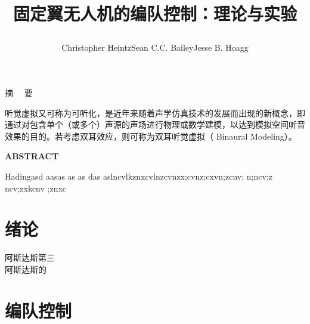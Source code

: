 \documentclass[UTF-8, linspread=1.25, zihao = -4]{ctexart}
\title
{
	\begin{spacing}{1}
		\fontsize{22pt}{22pt}
		\heiti	%
		固定翼无人机的编队控制：理论与实验
	\end{spacing}
}
\author{Christopher Heintz\qquad Sean C.C. Bailey\qquad Jesse B. Hoagg}
\renewenvironment{abstract}
{
	\par
	\vskip 24pt
	\fontsize{16pt}{16pt}
	\noindent\mbox{}\hfill{\heiti 摘 \ \ 要}\hfill\mbox{}
	\vskip 12pt
	\fontsize{12pt}{15pt}
}{\par}
\newenvironment{enabstract}
{
	\par
	\vskip 24pt
	\fontsize{16pt}{16pt}
	\noindent\mbox{}\hfill{\Roman \bf ABSTRACT}\hfill\mbox{}
	\vskip 12pt
	\fontsize{12pt}{15pt}
}{\par}
\begin{document}
	\maketitle
	\tableofcontents
	\begin{abstract}
	{
		听觉虚拟又可称为可听化，是近年来随着声学仿真技术的发展而出现的新概念，即通过对包含单个（或多个）声源的声场进行物理或数学建模，以达到模拟空间听音效果的目的。若考虑双耳效应，则可称为双耳听觉虚拟（ Binaural Modeling）。
	}
	\end{abstract}
	\begin{enabstract}
	{
		Hadingasd aasas as as das aslncvlkznxcvlnzcvnzx;cvnz;cxvn;zcnv; n;ncv;z ncv;zxkcnv ;znxc
	}
	\end{enabstract}
	\section{绪论}
	阿斯达斯第三
	\\
	阿斯达斯的
	\newpage
	\section{编队控制}
\end{document}
